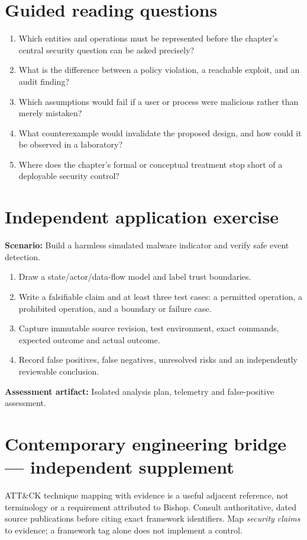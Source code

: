 \documentclass[10pt,letterpaper]{article}
\begin{document}
\section{Guided reading questions}
\begin{enumerate}
\item Which entities and operations must be represented before the chapter's central security question can be asked precisely?
\item What is the difference between a policy violation, a reachable exploit, and an audit finding?
\item Which assumptions would fail if a user or process were malicious rather than merely mistaken?
\item What counterexample would invalidate the proposed design, and how could it be observed in a laboratory?
\item Where does the chapter's formal or conceptual treatment stop short of a deployable security control?
\end{enumerate}
\section{Independent application exercise}
\textbf{Scenario:} Build a harmless simulated malware indicator and verify safe event detection.
\begin{enumerate}
\item Draw a state/actor/data-flow model and label trust boundaries.
\item Write a falsifiable claim and at least three test cases: a permitted operation, a prohibited operation, and a boundary or failure case.
\item Capture immutable source revision, test environment, exact commands, expected outcome and actual outcome.
\item Record false positives, false negatives, unresolved risks and an independently reviewable conclusion.
\end{enumerate}
\textbf{Assessment artifact:} Isolated analysis plan, telemetry and false-positive assessment.
\section{Contemporary engineering bridge --- independent supplement}
ATT\&CK technique mapping with evidence is a useful adjacent reference, not terminology or a requirement attributed to Bishop. Consult authoritative, dated source publications before citing exact framework identifiers. Map \emph{security claims} to evidence; a framework tag alone does not implement a control.
\end{document}
